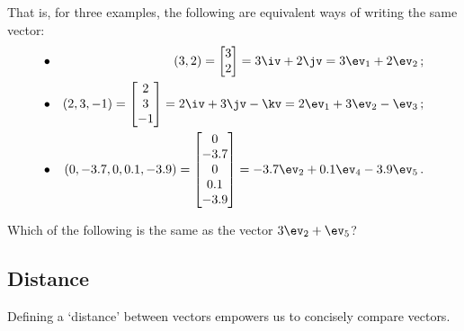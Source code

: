 That is, for three examples, the following are equivalent ways of writing the same vector:
\begin{eqnarray*}\bullet&&
(3,2)=\begin{bmatrix} 3\\2 \end{bmatrix}=3\iv+2\jv=3\ev_1+2\ev_2\,;
\\\bullet&&
(2,3,-1)=\begin{bmatrix} 2\\3\\-1 \end{bmatrix}
=2\iv+3\jv-\kv=2\ev_1+3\ev_2-\ev_3\,;
\\\bullet&&
(0,-3.7,0,0.1,-3.9)
=\begin{bmatrix} 0\\-3.7\\0\\0.1\\-3.9 \end{bmatrix}
=-3.7\ev_2+0.1\ev_4-3.9\ev_5\,.
\end{eqnarray*}




\begin{activity}
Which of the following is the same as the vector \(3\ev_2+\ev_5\)?
\end{activity}




\subsection{Distance}
Defining a `distance' between vectors empowers us to concisely compare vectors.

